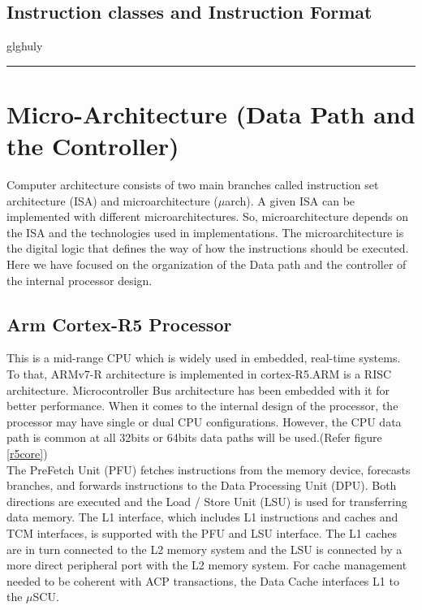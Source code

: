 \documentclass[a4paper,11pt]{article}
\begin{document}
\subsection{Instruction classes and Instruction Format}
glghuly

\vspace{1cm}\hrule

\section{Micro-Architecture (Data Path and the Controller)}
Computer architecture consists of two main branches called instruction set architecture (ISA) and microarchitecture ($\mu$arch). A given ISA can be implemented with different microarchitectures. So, microarchitecture depends on the ISA and the technologies used in implementations. The microarchitecture is the digital logic that defines the way of how the instructions should be executed. Here we have focused on the organization of the Data path and the controller of the internal processor design.
\subsection{Arm Cortex-R5 Processor}
This is a mid-range CPU which is widely used in embedded, real-time systems. To that, ARMv7-R architecture is implemented in cortex-R5.ARM is a RISC architecture. Microcontroller Bus architecture has been embedded with it for better performance. When it comes to the internal design of the processor, the processor may have single or dual CPU configurations. However, the CPU data path is common at all 32bits or 64bits data paths will be used.(Refer figure \ref{r5core}) \\

The PreFetch Unit (PFU) fetches instructions from the memory device, forecasts branches, and forwards instructions to the Data Processing Unit (DPU). Both directions are executed and the Load / Store Unit (LSU) is used for transferring data memory. The L1 interface, which includes L1 instructions and caches and TCM interfaces, is supported with the PFU and LSU interface. The L1 caches are in turn connected to the L2 memory system and the LSU is connected by a more direct peripheral port with the L2 memory system. For cache management needed to be coherent with ACP transactions, the Data Cache interfaces L1 to the $\mu$SCU.\\
\end{document}
